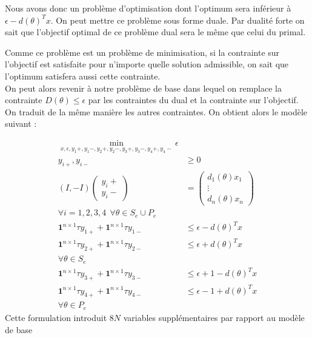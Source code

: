 Nous avons donc un problème d'optimisation dont l'optimum sera inférieur à $\epsilon- d(\theta)^T x $. On peut mettre ce problème sous forme duale. Par dualité forte on sait que l'objectif optimal de ce problème dual sera le même que celui du primal.

Comme ce problème est un problème de minimisation, si la contrainte sur l'objectif est satisfaite pour n'importe quelle solution admissible, on sait que l'optimum satisfera aussi cette contrainte.\\
On peut alors revenir à notre problème de base dans lequel on remplace la contrainte $D(\theta)\leq \epsilon$ par les contraintes du dual et la contrainte sur l'objectif.
On traduit de la même manière les autres contraintes. On obtient alors le modèle suivant :

\begin{align*}
\min_{x,\epsilon ,y_1+,y_1-,y_2+,y_2-,y_3+,y_3-,y_4+,y_4-} \epsilon &  \\
y_{i+},y_{i-}  & \geq  0 \\
(I,-I)
 \begin{pmatrix}
y_i+ \\
y_i-
\end{pmatrix}
& = 
\begin{pmatrix}
d_1(\theta)x_1 \\
\vdots \\
d_n(\theta)x_n 
\end{pmatrix} \\
\forall i = 1,2,3,4\:\:
\forall \theta \in S_e \cup P_e  &  \\
\mathbf{1}^{n\times 1}\tau y_{1+}+\mathbf{1}^{n\times 1}\tau y_{1-} & \leq \epsilon -d(\theta)^Tx \\
\mathbf{1}^{n\times 1}\tau y_{2+}+\mathbf{1}^{n\times 1}\tau y_{2-} & \leq \epsilon + d(\theta)^Tx \\
\forall \theta \in S_e &  \\
\mathbf{1}^{n\times 1}\tau y_{3+}+\mathbf{1}^{n\times 1}\tau y_{3-} & \leq  \epsilon +1 -d(\theta)^Tx \\
\mathbf{1}^{n\times 1}\tau y_{4+}+\mathbf{1}^{n\times 1}\tau y_{4-} & \leq  \epsilon -1 + d(\theta)^Tx \\
\forall \theta \in P_e & 
\end{align*}
Cette formulation introduit $8N$ variables supplémentaires par rapport au modèle de base


